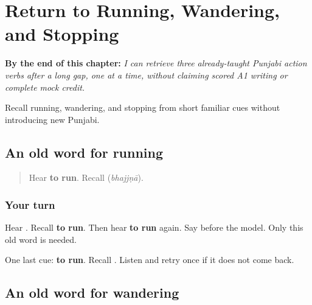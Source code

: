 
\chapter{Return to Running, Wandering, and Stopping}
\label{ch:pa-three-familiar-actions-r4}

\begin{chapteropening}
\textbf{By the end of this chapter:} \emph{I can retrieve three already-taught Punjabi action verbs after a long gap, one at a time, without claiming scored A1 writing or complete mock credit.}

Recall running, wandering, and stopping from short familiar cues without introducing new Punjabi.
\end{chapteropening}

\section[\texorpdfstring{\pa{ਭੱਜਣਾ} (bhajjṇā)}{ਭੱਜਣਾ (bhajjṇā)}]{An old word for running}

\label{lesson:PA-R166-run-again}



\begin{quote}
Hear \textbf{to run}. Recall \textbf{} (\emph{bhajjṇā}).
\end{quote}

\subsection*{Your turn}
Hear \textbf{}. Recall \textbf{to run}. Then hear \textbf{to run} again. Say \textbf{} before the model. Only this old word is needed.

\begin{tcolorbox}[breakable,colback=teal!4,colframe=teal!35!black,title={Before you move on}]
One last cue: \textbf{to run}. Recall \textbf{}. Listen and retry once if it does not come back.
\end{tcolorbox}
\section[\texorpdfstring{\pa{ਘੁੰਮਣਾ} (ghummṇā)}{ਘੁੰਮਣਾ (ghummṇā)}]{An old word for wandering}

